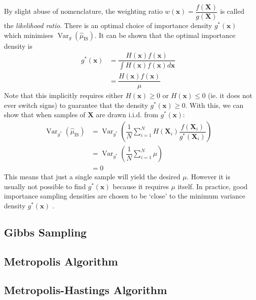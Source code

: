 \documentclass[11pt]{report} %
\begin{document}
By slight abuse of nomenclature, the weighting ratio $w\left(\mathbf{x}\right) = \dfrac{f\left(\mathbf{X}\right)}{g\left(\mathbf{X}\right)}$ is called the \textit{likelihood ratio}. There is an optimal choice of importance density $g^{*}\left(\mathbf{x}\right)$ which minimises $\operatorname{Var}_{g}\left(\hat{\mu}_{\mathrm{IS}}\right)$. It can be shown that the optimal importance density is
\begin{align}
g^{*}\left(\mathbf{x}\right) &= \dfrac{H\left(\mathbf{x}\right)f\left(\mathbf{x}\right)}{\int H\left(\mathbf{x}\right)f\left(\mathbf{x}\right)d\mathbf{x}} \\
&= \dfrac{H\left(\mathbf{x}\right)f\left(\mathbf{x}\right)}{\mu}
\end{align}
Note that this implicitly requires either $H\left(\mathbf{x}\right) \geq 0$ or $H\left(\mathbf{x}\right) \leq 0$ (ie. it does not ever switch signs) to guarantee that the density $g^{*}\left(\mathbf{x}\right) \geq 0$. With this, we can show that when samples of $\mathbf{X}$ are drawn i.i.d. from $g^{*}\left(\mathbf{x}\right)$:
\begin{align}
\operatorname{Var}_{g^{*}}\left(\hat{\mu}_{\mathrm{IS}}\right) &= \operatorname{Var}_{g^{*}}\left(\dfrac{1}{N}\sum_{i = 1}^{N}H\left(\mathbf{X}_{i}\right)\dfrac{f\left(\mathbf{X}_{i}\right)}{g^{*}\left(\mathbf{X}_{i}\right)}\right) \\
&= \operatorname{Var}_{g^{*}}\left(\dfrac{1}{N}\sum_{i = 1}^{N}\mu\right) \\
&= 0
\end{align}
This means that just a single sample will yield the desired $\mu$. However it is usually not possible to find $g^{*}\left(\mathbf{x}\right)$ because it requires $\mu$ itself. In practice, good importance sampling densities are chosen to be `close' to the minimum variance density $g^{*}\left(\mathbf{x}\right)$ \cite{Kroese2011}.

\subsection{Gibbs Sampling}

\subsection{Metropolis Algorithm}

\subsection{Metropolis-Hastings Algorithm}
\end{document}
